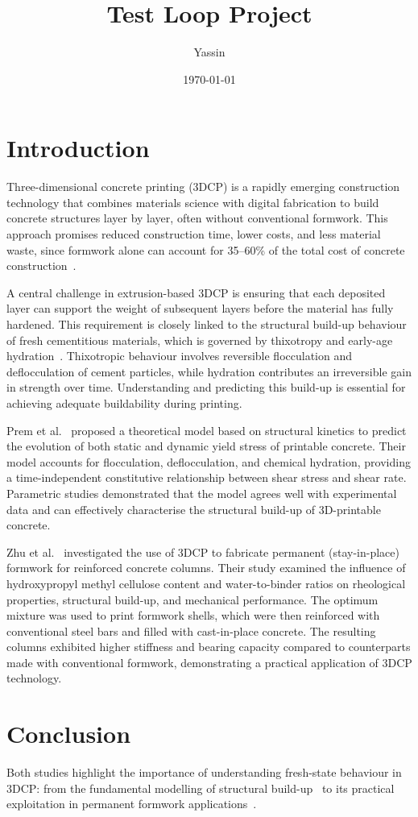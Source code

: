 \documentclass[12pt,a4paper]{article}
\title{Test Loop Project}
\author{Yassin}
\date{\today}
\begin{document}
\maketitle

\section{Introduction}
Three-dimensional concrete printing (3DCP) is a rapidly emerging construction technology that combines materials science with digital fabrication to build concrete structures layer by layer, often without conventional formwork. This approach promises reduced construction time, lower costs, and less material waste, since formwork alone can account for 35--60\% of the total cost of concrete construction~\cite{zhu3DConcretePrinting2021a}.

A central challenge in extrusion-based 3DCP is ensuring that each deposited layer can support the weight of subsequent layers before the material has fully hardened. This requirement is closely linked to the structural build-up behaviour of fresh cementitious materials, which is governed by thixotropy and early-age hydration~\cite{premStructuralBuildupModel2024a}. Thixotropic behaviour involves reversible flocculation and deflocculation of cement particles, while hydration contributes an irreversible gain in strength over time. Understanding and predicting this build-up is essential for achieving adequate buildability during printing.

Prem et al.~\cite{premStructuralBuildupModel2024a} proposed a theoretical model based on structural kinetics to predict the evolution of both static and dynamic yield stress of printable concrete. Their model accounts for flocculation, deflocculation, and chemical hydration, providing a time-independent constitutive relationship between shear stress and shear rate. Parametric studies demonstrated that the model agrees well with experimental data and can effectively characterise the structural build-up of 3D-printable concrete.

Zhu et al.~\cite{zhu3DConcretePrinting2021a} investigated the use of 3DCP to fabricate permanent (stay-in-place) formwork for reinforced concrete columns. Their study examined the influence of hydroxypropyl methyl cellulose content and water-to-binder ratios on rheological properties, structural build-up, and mechanical performance. The optimum mixture was used to print formwork shells, which were then reinforced with conventional steel bars and filled with cast-in-place concrete. The resulting columns exhibited higher stiffness and bearing capacity compared to counterparts made with conventional formwork, demonstrating a practical application of 3DCP technology.

\section{Conclusion}
Both studies highlight the importance of understanding fresh-state behaviour in 3DCP: from the fundamental modelling of structural build-up~\cite{premStructuralBuildupModel2024a} to its practical exploitation in permanent formwork applications~\cite{zhu3DConcretePrinting2021a}.

\printbibliography
\end{document}

